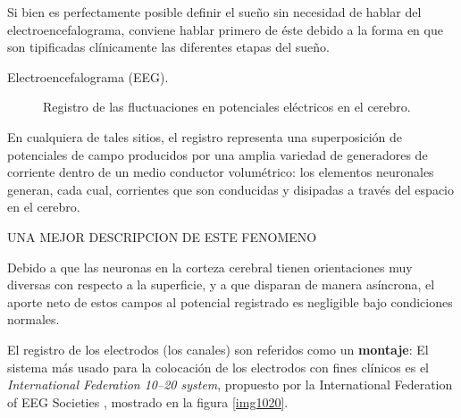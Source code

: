 

Si bien es perfectamente posible definir el sue\~no sin necesidad de hablar del 
electroencefalograma, conviene hablar primero de \'este debido a la forma en que son tipificadas
cl\'inicamente las diferentes etapas del sue\~no.

\begin{description}
\item[Electroencefalograma (EEG).] Registro de las fluctuaciones en potenciales el\'ectricos en el 
cerebro.
\end{description}

En cualquiera de tales sitios, el registro representa una superposici\'on de potenciales de campo 
producidos por una amplia variedad de generadores de corriente dentro de un medio conductor 
volum\'etrico: los elementos neuronales generan, cada cual, corrientes que son conducidas y 
disipadas a trav\'es del espacio en el cerebro.

UNA MEJOR DESCRIPCION DE ESTE FENOMENO

Debido a que las neuronas en la corteza cerebral tienen orientaciones muy diversas con respecto a 
la superficie, y a que disparan de manera as\'incrona, el aporte neto de estos campos al potencial 
registrado es negligible bajo condiciones normales.

El registro de los electrodos (los canales) son referidos como un \textbf{montaje}: 
El sistema m\'as usado para la colocaci\'on de los electrodos con fines cl\'inicos es el 
\textit{International Federation 10--20 system}, propuesto por la International Federation of EEG 
Societies \cite{Jasper58,AASM07}, mostrado en la figura \ref{img1020}. 

